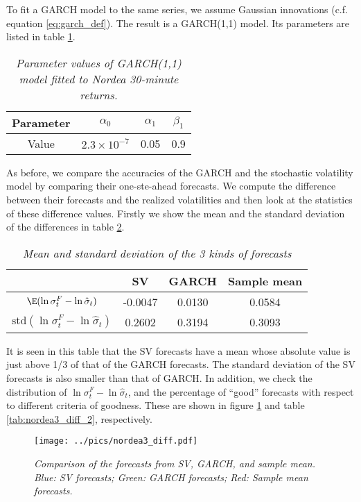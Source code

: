 To fit a GARCH model to the same series, we assume Gaussian
innovations (c.f. equation \ref{eq:garch_def}). The result is a
GARCH(1,1) model. Its parameters are listed in table
\ref{tab:nordea3_garch_param}.
\begin{table}[htb!]
  \centering
  \begin{tabular}{|c|c|c|c|}
    \hline
    Parameter & $\alpha_0$ & $\alpha_1$ & $\beta_1$ \\
    \hline
    Value & $2.3 \times 10^{-7}$ & 0.05 & 0.9\\
    \hline
  \end{tabular}
  \caption{\small \it Parameter values of GARCH(1,1) model fitted to
    Nordea 30-minute returns.}
  \label{tab:nordea3_garch_param}
\end{table}

As before, we compare the accuracies of the GARCH and the stochastic
volatility model by comparing their one-ste-ahead forecasts. We
compute the difference between their forecasts and the realized
volatilities and then look at the statistics of these difference
values. Firstly we show the mean and the standard deviation of the
differences in table \ref{tab:nordea3_diff_1}.
\begin{table}[htb!]
  \centering
  \begin{tabular}{|c|c|c|c|}
    \hline
     & SV & GARCH & Sample mean \\
     \hline
    $\E(\ln \sigma^F_t - \ln \hat{\sigma}_t)$ & -0.0047 & 0.0130 & 0.0584 \\
    \hline
     $\text{std}(\ln \sigma^F_t - \ln \hat{\sigma}_t)$ & 0.2602 &
     0.3194 & 0.3093 \\
    \hline
 \end{tabular}
  \caption{\small \it Mean and standard deviation of the 3 kinds of
    forecasts}
  \label{tab:nordea3_diff_1}
\end{table}
It is seen in this table that the SV forecasts have a mean whose
absolute value is just above 1/3 of that of the GARCH forecasts. The
standard deviation of the SV forecasts is also smaller than that of
GARCH. In addition, we check the distribution of
$\ln \sigma^F_t - \ln \hat{\sigma}_t$, and the percentage of ``good''
forecasts with respect to different criteria of goodness. These are
shown in figure \ref{fig:nordea3_diff} and table
\ref{tab:nordea3_diff_2}, respectively.
\begin{figure}[htb!]
  \centering
    \texttt{[image: ../pics/nordea3\_diff.pdf]}
  \caption{\small \it Comparison of the forecasts from SV, GARCH,
    and sample mean. Blue: SV forecasts; Green: GARCH forecasts; Red:
    Sample mean forecasts.}
  \label{fig:nordea3_diff}
\end{figure}
